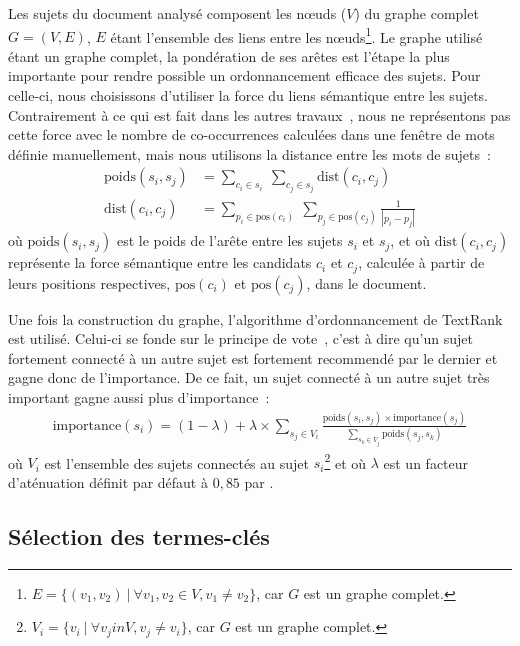     Les sujets du document analysé composent les n\oe{}uds ($V$) du graphe
    complet $G = (V, E)$, $E$ étant l'ensemble des liens entre les
    n\oe{}uds\footnote{$E = \{(v_1, v_2)\ |\ \forall{v_1, v_2 \in V}, v_1 \neq v_2\}$,
    car $G$ est un graphe complet.}. Le graphe utilisé étant un graphe complet,
    la pondération de ses arêtes est l'étape la plus importante pour rendre
    possible un ordonnancement efficace des sujets. Pour celle-ci, nous 
    choisissons d'utiliser la force du liens sémantique entre les sujets.
    Contrairement à ce qui est fait dans les autres
    travaux~\cite{wan2008expandrank,tsatsaronis2010semanticrank,liu2010topicalpagerank},
    nous ne représentons pas cette force avec le nombre de co-occurrences
    calculées dans une fenêtre de mots définie manuellement, mais nous utilisons
    la distance entre les mots de sujets~:
    \begin{align}
      \text{poids}(s_i, s_j) &= \sum_{c_i \in s_i}\ \sum_{c_j \in s_j} \text{dist}(c_i, c_j) \label{math:ponderation}\\
      \text{dist}(c_i, c_j) &= \sum_{p_i \in \text{pos}(c_i)}\ \sum_{p_j \in \text{pos}(c_j)} \frac{1}{|p_i - p_j|} \label{math:distance}
    \end{align}
    où $\text{poids}(s_i, s_j)$ est le poids de l'arête entre les sujets $s_i$
    et $s_j$, et où $\text{dist}(c_i, c_j)$ représente la force sémantique entre
    les candidats $c_i$ et $c_j$, calculée à partir de leurs positions
    respectives, $\text{pos}(c_i)$ et $\text{pos}(c_j)$, dans le document.

    Une fois la construction du graphe, l'algorithme d'ordonnancement de
    TextRank est utilisé. Celui-ci se fonde sur le principe de \og vote~\fg,
    c'est à dire qu'un sujet fortement connecté à un autre sujet est fortement
    recommendé par le dernier et gagne donc de l'importance. De ce fait, un
    sujet connecté à un autre sujet très important gagne aussi plus
    d'importance~:
    \begin{align}
      \text{importance}(s_i) = (1 - \lambda) + \lambda \times \sum_{s_j \in V_i} \frac{\text{poids}(s_i, s_j) \times \text{importance}(s_j)}{\sum_{s_k \in V_j} \text{poids}(s_j, s_k)} \label{math:textrank}
    \end{align}
    où $V_i$ est l'ensemble des sujets connectés au sujet
    $s_i$\footnote{$V_i = \{v_i\ |\ \forall{v_j in V}, v_j \neq v_i\}$,
    car $G$ est un graphe complet.} et où $\lambda$ est un facteur d'aténuation
    définit par défaut à $0,85$ par .

  \subsection{Sélection des termes-clés}
  \label{subsec:selection_des_termes_cles}


